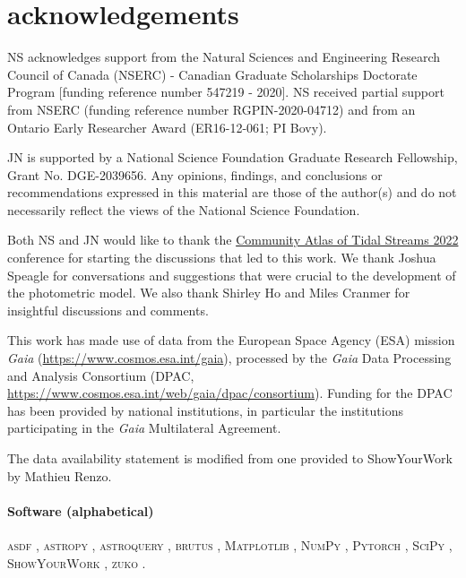 \documentclass[twocolumn]{aastex631}
\newcommand{\code}[1]{\textsc{#1}}
\newcommand{\package}[1]{\code{#1}}
\newcommand{\dataarchive}[1]{\textit{#1}}
\newcommand{\Gaia}{\dataarchive{Gaia}}
\begin{document}


\newpage
\section{acknowledgements}

    NS acknowledges support from the Natural Sciences and Engineering Research
    Council of Canada (NSERC) - Canadian Graduate Scholarships Doctorate Program
    [funding reference number 547219 - 2020].  NS received partial support from
    NSERC (funding reference number RGPIN-2020-04712) and from an Ontario Early
    Researcher Award (ER16-12-061; PI Bovy).

    JN is supported by a National Science Foundation Graduate Research
    Fellowship, Grant No. DGE-2039656. Any opinions, findings, and conclusions
    or recommendations expressed in this material are those of the author(s) and
    do not necessarily reflect the views of the National Science Foundation.
    
    Both NS and JN would like to thank the
    \href{https://stellarstreams.org/streams22/}{Community Atlas of Tidal
    Streams 2022} conference for starting the discussions that led to this work.
    We thank Joshua Speagle for conversations and suggestions that were crucial
    to the development of the photometric model. We also thank Shirley Ho and
    Miles Cranmer for insightful discussions and comments.

    This work has made use of data from the European Space Agency (ESA) mission
    \Gaia{} (\url{https://www.cosmos.esa.int/gaia}), processed by the \Gaia{}
    Data Processing and Analysis Consortium (DPAC,
    \url{https://www.cosmos.esa.int/web/gaia/dpac/consortium}). Funding for the
    DPAC has been provided by national institutions, in particular the
    institutions participating in the \Gaia{} Multilateral Agreement.

    The data availability statement is modified from one provided to
    ShowYourWork by Mathieu Renzo.

    \paragraph{Software (alphabetical)}

        \package{asdf} \citep{Greenfield+2015}, %
        \package{astropy} \citep{Astropy2013, Astropy2018, Astropy2022}, %
        \package{astroquery} \citep{Astroquery2019}, %
        \package{brutus} \citep{brutus}, %
        \package{Matplotlib} \citep{Hunter2007}, %
        \package{NumPy} \citep{Harris+2020}, %
        \package{Pytorch} \citep{Pytorch2019}, %
        \package{SciPy} \citep{Scipy2020}, %
        \package{ShowYourWork} \citep{Luger+2021}, %
        \package{zuko} \citep{zuko}. %
\end{document}
